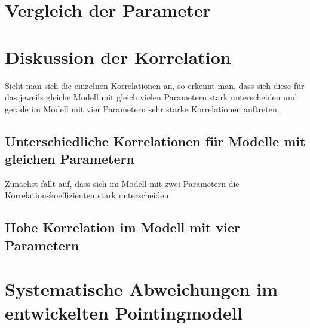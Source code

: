 \section{Vergleich der Parameter}

\section{Diskussion der Korrelation}
Sieht man sich die einzelnen Korrelationen an, so erkennt man, dass sich diese für das jeweils gleiche Modell mit gleich vielen Parametern stark unterscheiden und gerade im Modell mit vier Parametern sehr starke Korrelationen auftreten.
\subsection{Unterschiedliche Korrelationen für Modelle mit gleichen Parametern}
Zunächst fällt auf, dass sich im Modell mit zwei Parametern die Korrelationskoeffizienten stark unterscheiden
\subsection{Hohe Korrelation im Modell mit vier Parametern}

\section{Systematische Abweichungen im entwickelten Pointingmodell}

